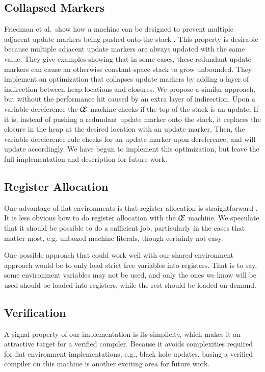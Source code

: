 \subsection{Collapsed Markers}
Friedman et al.\ show how a machine can be designed to prevent multiple adjacent
update markers being pushed onto the stack \cite{lkm}.  This property is
desirable because multiple adjacent update markers are always updated with the
same value. They give examples showing that in some cases, these redundant
update markers can cause an otherwise constant-space stack to grow unbounded.
They implement an optimization that collapses update markers by adding a layer
of indirection between heap locations and closures. We propose a similar
approach, but without the performance hit caused by an extra layer of
indirection. Upon a variable dereference the $\mathcal{\mathcal{C} \mskip -4mu \mathcal{E}}$ machine checks if the
top of the stack is an update. If it is, instead of pushing a redundant update
marker onto the stack, it replaces the closure in the heap at the desired
location with an update marker.  Then, the variable dereference rule checks for
an update marker upon dereference, and will update accordingly. We have begun
to implement this optimization, but leave the full implementation and
description for future work.

\subsection{Register Allocation} \label{sec:alloc}
One advantage of flat environments is that register allocation is
straightforward \cite{appel1992compiling,jonesstg,terei2010llvm}. It is less
obvious how to do register allocation with the $\mathcal{\mathcal{C} \mskip
-4mu \mathcal{E}}$ machine. We speculate that it should be possible to do a
sufficient job, particularly in the cases that matter most, e.g. unboxed
machine literals, though certainly not easy. 

One possible approach that could work well with our shared environment approach
would be to only load strict free variables into registers. That is to say,
some environment variables may not be used, and only the ones we know will be
used should be loaded into registers, while the rest should be loaded on demand. 

\subsection{Verification}
A signal property of our implementation is its simplicity, which makes it an
attractive target for a verified compiler. Because it avoids complexities
required for flat environment implementations, e.g., black hole updates, basing
a verified compiler on this machine is another exciting area for future work. 
